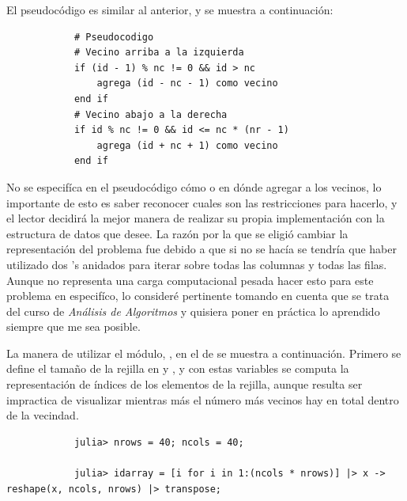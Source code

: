 \begin{enumerate}
\begin{solution}
        El pseudocódigo es similar al anterior, y se muestra a continuación:
        \begin{verbatim}
            # Pseudocodigo
            # Vecino arriba a la izquierda
            if (id - 1) % nc != 0 && id > nc
                agrega (id - nc - 1) como vecino
            end if
            # Vecino abajo a la derecha
            if id % nc != 0 && id <= nc * (nr - 1)
                agrega (id + nc + 1) como vecino
            end if
        \end{verbatim}
        No se especifíca en el pseudocódigo cómo o en dónde agregar a los vecinos, lo importante de esto es saber reconocer cuales son las restricciones para hacerlo, y el lector decidirá la mejor manera de realizar su propia implementación con la estructura de datos que desee. La razón por la que se eligió cambiar la representación del problema fue debido a que si no se hacía se tendría que haber utilizado dos 's anidados para iterar sobre todas las columnas y todas las filas. Aunque no representa una carga computacional pesada hacer esto para este problema en especifíco, lo consideré pertinente tomando en cuenta que se trata del curso de \textit{Análisis de Algoritmos} y quisiera poner en práctica lo aprendido siempre que me sea posible.

        La manera de utilizar el módulo, , en el  de  se muestra a continuación. Primero se define el tamaño de la rejilla en  y , y con estas variables se computa la representación de índices de los elementos de la rejilla, aunque resulta ser impractica de visualizar mientras más el número más vecinos hay en total dentro de la vecindad.
        \begin{verbatim}
            julia> nrows = 40; ncols = 40;

            julia> idarray = [i for i in 1:(ncols * nrows)] |> x -> reshape(x, ncols, nrows) |> transpose;


\end{verbatim}
\end{solution}
\end{enumerate}
